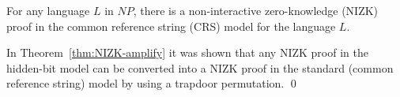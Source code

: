\begin{theorem}\label{the:NIZK_NP}
For any language $L$ in $NP$, there is a non-interactive zero-knowledge (NIZK) proof
in the common reference string (CRS) model for the language $L$.
\end{theorem}
\proof
In Theorem~\ref{thm:NIZK-amplify} it was shown that any NIZK proof in the hidden-bit model can
be converted into a NIZK proof in the standard (common reference string) model by using
a trapdoor permutation.
\qed
